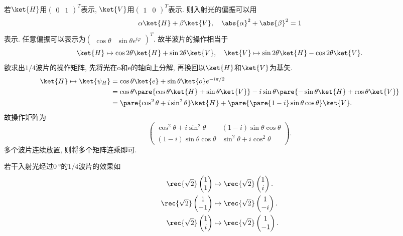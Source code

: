 \documentclass{ctexart}
\begin{document}
若$\ket{H}$用$\begin{pmatrix}
    0 & 1
\end{pmatrix}^T$表示, $\ket{V}$用$\begin{pmatrix}
    1 & 0
\end{pmatrix}^T$表示. 则入射光的偏振可以用
\[ \alpha \ket{H} + \beta\ket{V},\quad \abs{\alpha}^2 + \abs{\beta}^2 = 1 \]
表示. 任意偏振可以表示为$\begin{pmatrix}
    \cos\theta & \sin\theta e^{i\varphi}
\end{pmatrix}^T$. 故半波片的操作相当于
\[ \ket{H} \mapsto \cos 2\theta \ket{H} + \sin 2\theta\ket{V},\quad \ket{V} \mapsto \sin 2\theta \ket{H} - \cos 2\theta \ket{V}. \]
欲求出$1/4$波片的操作矩阵, 先将光在o和e的轴向上分解, 再换回以$\ket{H}$和$\ket{V}$为基矢.
\begin{align*}
    \ket{H} \mapsto \ket{\psi_H} &= \cos \theta \ket{e} + \sin\theta \ket{o} e^{-i\pi/2} \\
    &= \cos\theta \pare{\cos\theta \ket{H} + \sin\theta\ket{V}} - i\sin\theta\pare{-\sin\theta \ket{H} + \cos\theta\ket{V}} \\
    &= \pare{\cos^2\theta + i\sin^2\theta}\ket{H} + \pare{\pare{1-i}\sin\theta\cos\theta}\ket{V}.
\end{align*}
故操作矩阵为
\[ \begin{pmatrix}
  \cos^2\theta + i\sin^2\theta & (1 - i)\sin\theta \cos\theta \\
  (1 - i)\sin\theta \cos\theta & \sin^2\theta + i\cos^2\theta
\end{pmatrix}. \]
多个波片连续放置, 则将多个矩阵连乘即可.
\begin{sample}
    \begin{ex}
        若干入射光经过$\SI{0}{\degree}$的$1/4$波片的效果如
        \begin{align*}
            \rec{\sqrt{2}} \begin{pmatrix}
                1 \\ 1
            \end{pmatrix} &\mapsto \rec{\sqrt{2}}\begin{pmatrix}
                1 \\ i
            \end{pmatrix}. \\
            \rec{\sqrt{2}} \begin{pmatrix}
                1 \\ -1
            \end{pmatrix} &\mapsto \rec{\sqrt{2}}\begin{pmatrix}
                1 \\ -i
            \end{pmatrix}. \\
            \rec{\sqrt{2}} \begin{pmatrix}
                1 \\ i
            \end{pmatrix} &\mapsto \rec{\sqrt{2}}\begin{pmatrix}
                1 \\ -1
            \end{pmatrix}.
        \end{align*}
    \end{ex}
\end{sample}
\end{document}
